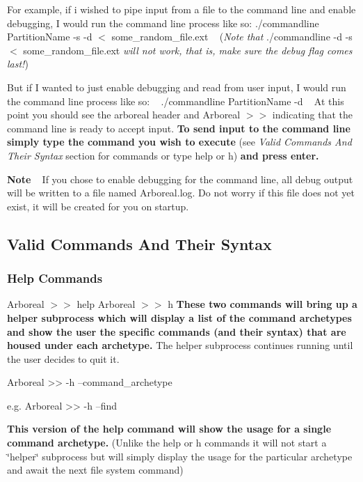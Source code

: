 For example, if i wished to pipe input from a file to the command line and enable debugging, I would run the command line process like so\+: {\ttfamily ./commandline Partition\+Name -\/s -\/d $<$ some\+\_\+random\+\_\+file.\+ext} ~\newline
 ({\itshape Note that} {\ttfamily ./commandline -\/d -\/s $<$ some\+\_\+random\+\_\+file.\+ext} {\itshape will not work, that is, make sure the debug flag comes last!})

But if I wanted to just enable debugging and read from user input, I would run the command line process like so\+: ~\newline
{\ttfamily ./commandline Partition\+Name -\/d} ~\newline
 At this point you should see the arboreal header and {\ttfamily Arboreal $>$$>$} indicating that the command line is ready to accept input. {\bfseries To send input to the command line simply type the command you wish to execute} (see {\itshape Valid Commands And Their Syntax} section for commands or type {\ttfamily help} or {\ttfamily h}) {\bfseries and press enter.}

{\bfseries Note} ~\newline
If you chose to enable debugging for the command line, all debug output will be written to a file named {\ttfamily Arboreal.\+log}. Do not worry if this file does not yet exist, it will be created for you on startup.

\subsection*{Valid Commands And Their Syntax}

\subsubsection*{Help Commands}

Arboreal $>$$>$ help Arboreal $>$$>$ h {\bfseries These two commands will bring up a helper subprocess which will display a list of the command archetypes and show the user the specific commands (and their syntax) that are housed under each archetype.} The helper subprocess continues running until the user decides to quit it. \begin{DoxyVerb}Arboreal >> -h --command_archetype

e.g.
Arboreal >> -h --find   
\end{DoxyVerb}
 {\bfseries This version of the help command will show the usage for a single command archetype.} (Unlike the {\ttfamily help} or {\ttfamily h} commands it will not start a \char`\"{}helper\char`\"{} subprocess but will simply display the usage for the particular archetype and await the next file system command) ~\newline


